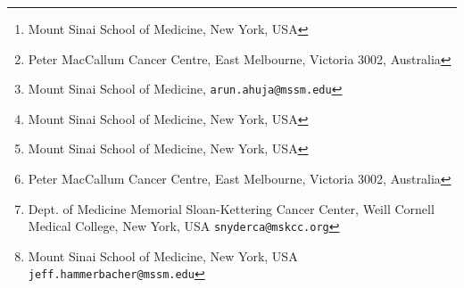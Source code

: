 \author{
Timothy O'Donnell\thanks{Mount Sinai School of Medicine, New York, USA},~
Elizabeth L. Christie\thanks{Peter MacCallum Cancer Centre, East Melbourne, Victoria 3002, Australia},~
Arun Ahuja\thanks{Mount Sinai School of Medicine, \texttt{arun.ahuja@mssm.edu}},~
Jacki Novik\thanks{Mount Sinai School of Medicine, New York, USA},~
B. Arman Aksoy\thanks{Mount Sinai School of Medicine, New York, USA},~
David D. L. Bowtell\thanks{Peter MacCallum Cancer Centre, East Melbourne, Victoria 3002, Australia},~
Alexandra Snyder\thanks{Dept. of Medicine Memorial Sloan-Kettering Cancer Center, Weill Cornell Medical College, New York, USA \texttt{snyderca@mskcc.org}},~
Jeff Hammerbacher\thanks{Mount Sinai School of Medicine, New York, USA \texttt{jeff.hammerbacher@mssm.edu}}
}

